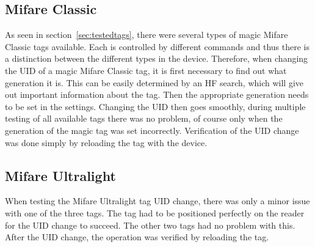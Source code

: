 \subsection{Mifare Classic}
As seen in section~\ref{sec:testedtags}, there were several types of magic Mifare Classic tags available. Each is controlled by different commands and thus there is a distinction between the different types in the device. Therefore, when changing the UID of a magic Mifare Classic tag, it is first necessary to find out what generation it is. This can be easily determined by an HF search, which will give out important information about the tag. Then the appropriate generation needs to be set in the settings. Changing the UID then goes smoothly, during multiple testing of all available tags there was no problem, of course only when the generation of the magic tag was set incorrectly. Verification of the UID change was done simply by reloading the tag with the device.


\subsection{Mifare Ultralight}
When testing the Mifare Ultralight tag UID change, there was only a minor issue with one of the three tags. The tag had to be positioned perfectly on the reader for the UID change to succeed. The other two tags had no problem with this. After the UID change, the operation was verified by reloading the tag.
